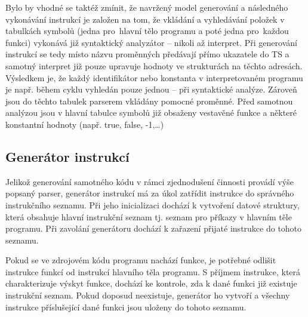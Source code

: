 \documentclass[12pt,a4paper,titlepage,final]{article}
\begin{document}
Bylo by vhodné se taktéž zmínit, že navržený model generování a následného 
vykonávání instrukcí je založen na tom, že vkládání a vyhledávání položek 
v tabulkách symbolů (jedna pro~hlavní tělo programu a poté jedna pro~každou 
funkci) vykonává již syntaktický analyzátor – nikoli až interpret. 
Při generování instrukcí se tedy místo názvu proměnných předávají přímo 
ukazatele do TS a samotný interpret již pouze upravuje hodnoty ve strukturách 
na těchto adresách. Výsledkem je, že každý identifikátor nebo konstanta 
v interpretovaném programu je např. během cyklu vyhledán pouze jednou – při 
syntaktické analýze. Zároveň jsou do těchto tabulek parserem vkládány pomocné 
proměnné. Před samotnou analýzou jsou v hlavní tabulce symbolů již obsaženy 
vestavěné funkce a některé konstantní hodnoty (např. true, false, -1,\dots)

\subsection{Generátor instrukcí}
Jelikož generování samotného kódu v rámci zjednodušení činnosti provádí výše 
popsaný parser, generátor instrukcí má za úkol zatřídit instrukce do správného 
instrukčního seznamu. Při jeho inicializaci dochází k vytvoření datové 
struktury, která obsahuje hlavní instrukční seznam tj. seznam pro příkazy 
v hlavním těle programu. Při zavolání generátoru dochází k zařazení přijaté 
instrukce do tohoto seznamu.

Pokud se ve zdrojovém kódu programu nachází funkce, je potřebné odlišit 
instrukce funkcí od instrukcí hlavního těla programu. S příjmem instrukce, 
která charakterizuje výskyt funkce, dochází ke kontrole, zda k dané funkci 
již existuje instrukční seznam. Pokud doposud neexistuje, generátor ho 
vytvoří a všechny instrukce příslušející dané funkci jsou uloženy 
do tohoto seznamu. 

\end{document}

